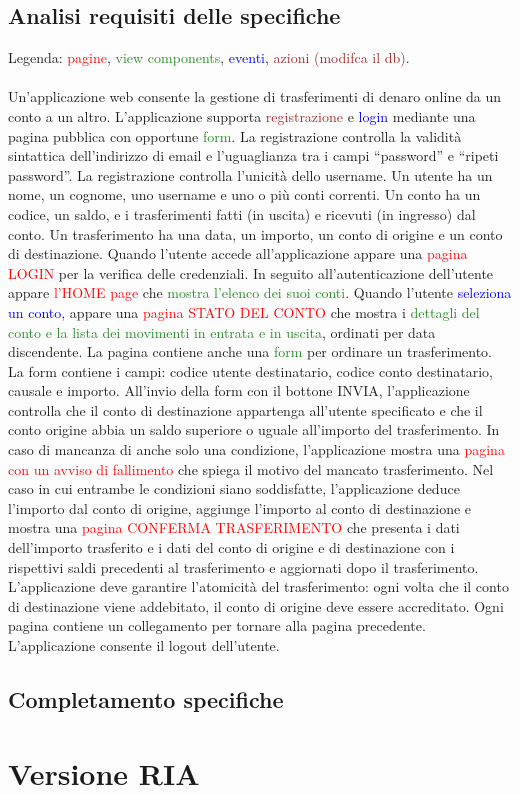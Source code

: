 \documentclass{article}
\begin{document}
\subsection{Analisi requisiti delle specifiche}
Legenda: \textcolor{red}{pagine}, \textcolor{ForestGreen}{view components}, \textcolor{blue}{eventi}, \textcolor{brown}{azioni (modifca il db)}.
\\
\\
Un’applicazione web consente la gestione di trasferimenti di denaro online da un conto a un
altro. L’applicazione supporta  \textcolor{brown}{registrazione} e  \textcolor{blue}{login} mediante una pagina pubblica con
opportune  \textcolor{ForestGreen}{form}. La registrazione controlla la validità sintattica dell’indirizzo di email e
l’uguaglianza tra i campi “password” e “ripeti password”. La registrazione controlla l’unicità
dello username. Un utente ha un nome, un cognome, uno username e uno o più conti correnti.
Un conto ha un codice, un saldo, e i trasferimenti fatti (in uscita) e ricevuti (in ingresso) dal
conto. Un trasferimento ha una data, un importo, un conto di origine e un conto di destinazione.
Quando l’utente accede all’applicazione appare una  \textcolor{red}{pagina LOGIN} per la verifica delle
credenziali. In seguito all’autenticazione dell’utente appare \textcolor{red}{l’HOME page} che \textcolor{ForestGreen}{mostra l’elenco
dei suoi conti}. Quando l’utente  \textcolor{blue}{seleziona un conto}, appare una \textcolor{red}{pagina STATO DEL CONTO}
che mostra i \textcolor{ForestGreen}{dettagli del conto e la lista dei movimenti in entrata e in uscita}, ordinati per data
discendente. La pagina contiene anche una \textcolor{ForestGreen}{form} per ordinare un trasferimento. La form
contiene i campi: codice utente destinatario, codice conto destinatario, causale e importo.
All’invio della form con il bottone INVIA, l’applicazione controlla che il conto di destinazione
appartenga all’utente specificato e che il conto origine abbia un saldo superiore o uguale
all’importo del trasferimento. In caso di mancanza di anche solo una condizione, l’applicazione
mostra una \textcolor{red}{pagina con un avviso di fallimento} che spiega il motivo del mancato trasferimento.
Nel caso in cui entrambe le condizioni siano soddisfatte, l’applicazione deduce l’importo dal
conto di origine, aggiunge l’importo al conto di destinazione e mostra una \textcolor{red}{pagina CONFERMA
TRASFERIMENTO} che presenta i dati dell’importo trasferito e i dati del conto di origine e di
destinazione con i rispettivi saldi precedenti al trasferimento e aggiornati dopo il trasferimento.
L’applicazione deve garantire l’atomicità del trasferimento: ogni volta che il conto di
destinazione viene addebitato, il conto di origine deve essere accreditato. Ogni pagina
contiene un collegamento per tornare alla pagina precedente. L’applicazione consente il
logout dell’utente.

\subsection{Completamento specifiche}

\section{Versione RIA}
\end{document}
